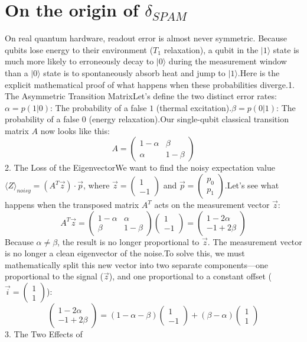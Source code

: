 \documentclass[11pt]{article}
\begin{document}
\section{On the origin of $\delta_{SPAM}$}
On real quantum hardware, readout error is almost never symmetric. Because qubits lose energy to their environment ($T_1$ relaxation), a qubit in the $|1\rangle$ state is much more likely to erroneously decay to $|0\rangle$ during the measurement window than a $|0\rangle$ state is to spontaneously absorb heat and jump to $|1\rangle$.Here is the explicit mathematical proof of what happens when these probabilities diverge.1. The Asymmetric Transition MatrixLet’s define the two distinct error rates:$\alpha = p(1|0)$: The probability of a false $1$ (thermal excitation).$\beta = p(0|1)$: The probability of a false $0$ (energy relaxation).Our single-qubit classical transition matrix $A$ now looks like this:$$A = \begin{pmatrix} 1 - \alpha & \beta \\ \alpha & 1 - \beta \end{pmatrix}$$2. The Loss of the EigenvectorWe want to find the noisy expectation value $\langle Z \rangle_{noisy} = (A^T \vec{z}) \cdot \vec{p}$, where $\vec{z} = \begin{pmatrix} 1 \\ -1 \end{pmatrix}$ and $\vec{p} = \begin{pmatrix} p_0 \\ p_1 \end{pmatrix}$.Let's see what happens when the transposed matrix $A^T$ acts on the measurement vector $\vec{z}$:$$A^T \vec{z} = \begin{pmatrix} 1 - \alpha & \alpha \\ \beta & 1 - \beta \end{pmatrix} \begin{pmatrix} 1 \\ -1 \end{pmatrix} = \begin{pmatrix} 1 - 2\alpha \\ -1 + 2\beta \end{pmatrix}$$Because $\alpha \neq \beta$, the result is no longer proportional to $\vec{z}$. The measurement vector is no longer a clean eigenvector of the noise.To solve this, we must mathematically split this new vector into two separate components—one proportional to the signal ($\vec{z}$), and one proportional to a constant offset ($\vec{i} = \begin{pmatrix} 1 \\ 1 \end{pmatrix}$):$$\begin{pmatrix} 1 - 2\alpha \\ -1 + 2\beta \end{pmatrix} = (1 - \alpha - \beta) \begin{pmatrix} 1 \\ -1 \end{pmatrix} + (\beta - \alpha) \begin{pmatrix} 1 \\ 1 \end{pmatrix}$$3. The Two Effects of 
\end{document}
